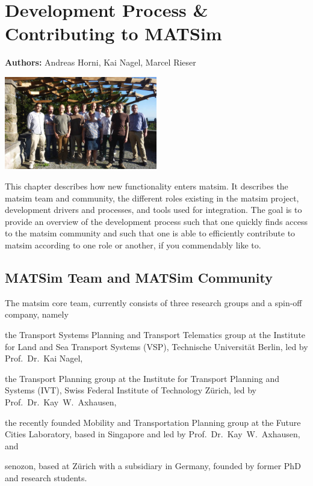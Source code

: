 \chapter{Development Process \& Contributing to MATSim}
\label{ch:developmentprocess}

\hfill \textbf{Authors:} Andreas Horni, Kai Nagel, Marcel Rieser

\begin{center} \includegraphics[width=0.5\textwidth, angle=0]{extending/figures/ConceptualMeetingVillaHatt.png} \end{center}

This chapter describes how new functionality enters \gls{matsim}. It describes the \gls{matsim} team and community, the different roles existing in the \gls{matsim} project, development drivers and processes, and tools used for integration. The goal is to 
provide an overview of the development process such that 
one quickly finds access to the \gls{matsim} community and such that 
one is able to efficiently contribute to \gls{matsim} according to one role or another, if you commendably like to.

\section{MATSim Team and MATSim Community}
The \gls{matsim} core team, 
currently consists of three research groups and a spin-off company, namely 
\begin{compactitem}
\item the Transport Systems Planning and Transport Telematics group at the Institute for Land and Sea Transport Systems (VSP), Technische Universität Berlin, led by Prof.~Dr.~Kai Nagel,
\item the Transport Planning group at the Institute for Transport Planning and Systems (IVT), Swiss Federal Institute of Technology Zürich, led by Prof.~Dr.~Kay~W.~Axhausen, 
\item the recently founded Mobility and Transportation Planning group at the Future Cities Laboratory, based in Singapore and led by Prof.~Dr.~Kay~W.~Axhausen, and 
\item \gls{senozon}, based at Zürich with a subsidiary in Germany, founded by former PhD and research students. 
\end{compactitem}

